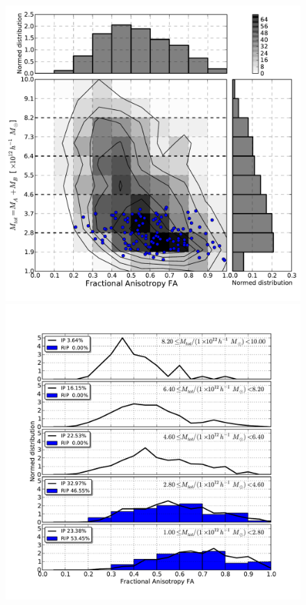 \documentclass[usenatbib]{latex/mn2e}
\begin{document}
\begin{flushleft}
\begin{figure}
\begin{center}

  \includegraphics[trim = 2mm 9mm 3mm 4mm, clip, keepaspectratio=true,
  width=0.36\textheight]{./figures/2D_totalmass_FA_BDM_Tweb}
  \includegraphics[trim = 4mm 9mm 17mm 15mm, clip, keepaspectratio=true,
  width=0.36\textheight]{./figures/single_totalmass_FA_BDM_Tweb}
  

\end{center}
\end{figure}
\end{flushleft}
\end{document}
